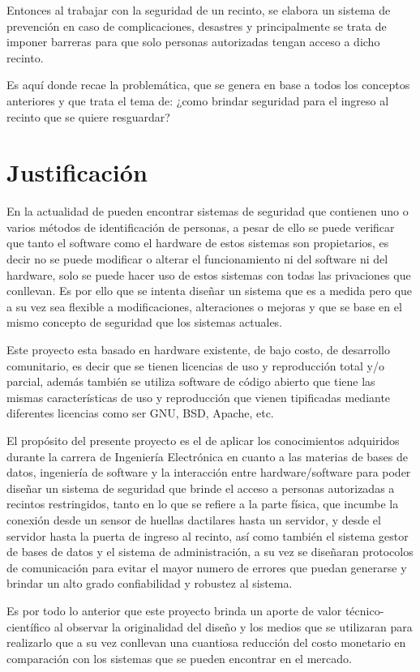 \documentclass[12pt, letterpaper]{scrartcl}
\begin{document}
	Entonces al trabajar con la seguridad de un recinto, se elabora un sistema de prevención en caso de complicaciones, desastres y principalmente se trata de imponer barreras para que solo personas autorizadas tengan acceso a dicho recinto.
	
	Es aquí donde recae la problemática, que se genera en base a todos los conceptos anteriores y que trata el tema de: ¿como brindar seguridad para el ingreso al recinto que se quiere resguardar?
	
	\section{Justificación}
	En la actualidad de pueden encontrar sistemas de seguridad que contienen uno o varios métodos de identificación de personas, a pesar de ello se puede verificar que tanto el software como el hardware de estos sistemas son propietarios, es decir no se puede modificar o alterar el funcionamiento ni del software ni del hardware, solo se puede hacer uso de estos sistemas con todas las privaciones que conllevan. Es por ello que se intenta diseñar un sistema que es a medida pero que a su vez sea flexible a modificaciones, alteraciones o mejoras y que se base en el mismo concepto de seguridad que los sistemas actuales.
	
	Este proyecto esta basado en hardware existente, de bajo costo, de desarrollo comunitario, es decir que se tienen licencias de uso y reproducción total y/o parcial, además también se utiliza software de código abierto que tiene las mismas características de uso y reproducción que vienen tipificadas mediante diferentes licencias como ser GNU, BSD, Apache, etc.
	
	El propósito del presente proyecto es el de aplicar los conocimientos adquiridos durante la carrera de Ingeniería Electrónica en cuanto a las materias de bases de datos, ingeniería de software y la interacción entre hardware/software para poder diseñar un sistema de seguridad que brinde el acceso a personas autorizadas a recintos restringidos, tanto en lo que se refiere a la parte física, que incumbe la conexión desde un sensor de huellas dactilares hasta un servidor, y desde el servidor hasta la puerta de ingreso al recinto, así como también el sistema gestor de bases de datos y el sistema de administración, a su vez se diseñaran protocolos de comunicación para evitar el mayor numero de errores que puedan generarse y brindar un alto grado confiabilidad y robustez al sistema.
	
	Es por todo lo anterior que este proyecto brinda un aporte de valor técnico-científico al observar la originalidad del diseño y los medios que se utilizaran para realizarlo que a su vez conllevan una cuantiosa reducción del costo monetario en comparación con los sistemas que se pueden encontrar en el mercado.
	
\end{document}
